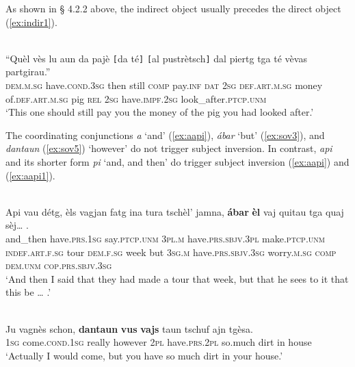 As shown in § 4.2.2 above, the indirect object usually precedes the direct object (\ref{ex:indir1}).

\ea
\label{ex:indir1}
\\
\gll    “Quèl vès lu aun da pajè \texttt{[}da té\texttt{]} \texttt{[}al pustrètsch\texttt{]} dal piertg tga té vèvas partgirau.” \\
\textsc{dem.m.sg} have.\textsc{cond.3sg} then still \textsc{comp} pay.\textsc{inf} \textsc{dat} \textsc{2sg} \textsc{def.art.m.sg} money of.\textsc{def.art.m.sg} pig \textsc{rel} \textsc{2sg} have.\textsc{impf.2sg} look\_after.\textsc{ptcp.unm}\\
\glt `This one should still pay you the money of the pig you had looked after.'
\z

The coordinating conjunctions \textit{a} `and' (\ref{ex:aapi}), \textit{ábar} `but' (\ref{ex:sov3}), and \textit{dantaun} (\ref{ex:sov5}) `however' do not trigger subject inversion. In contrast, \textit{api} and its shorter form \textit{pi} `and, and then' do trigger subject inversion (\ref{ex:aapi}) and (\ref{ex:aapi1}).

\ea
\label{ex:sov3}
\\
\gll Api vau détg, èls vagjan fatg ina tura tschèl’ jamna, \textbf{ábar} \textbf{èl} vaj quitau tga quaj sèj… .\\  
and\_then have.\textsc{prs.1sg} say.\textsc{ptcp.unm} \textsc{3pl.m} have.\textsc{prs.sbjv.3pl} make.\textsc{ptcp.unm} \textsc{indef.art.f.sg} tour  \textsc{dem.f.sg} week but \textsc{3sg.m} have.\textsc{prs.sbjv.3sg} worry.\textsc{m.sg} \textsc{comp} \textsc{dem.unm} \textsc{cop.prs.sbjv.3sg} \\
\glt `And then I said that they had made a tour that week, but that he sees to it that this be … .'
\z

\ea\label{ex:sov5}
 {\citealt[18]{Berther1998}}\\
\gll    Ju vagnès schon, \textbf{dantaun} \textbf{vus} \textbf{vajs} taun tschuf ajn tgèsa.\\
\textsc{1sg} come.\textsc{cond.1sg} really however \textsc{2pl} have.\textsc{prs.2pl} so.much dirt in house\\
\glt `Actually I would come, but you have so much dirt in your house.'
\z

